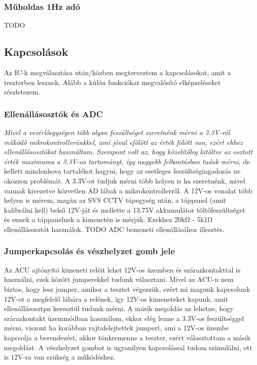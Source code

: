 \documentclass[a4paper, 12pt]{article}
\newcommand{\tab}{\hspace*{1em}}
\begin{document}
\subsubsection{Műholdas 1Hz adó}
TODO



\subsection{Kapcsolások}
Az IC-k megválasztása után/közben megterveztem a kapcsolásokat, amit a teszterben lesznek. Alább a külön funkciókat megvalósító elképzeléseket részletezem.
\subsubsection{Ellenállásosztók és ADC}
\emph{\tab Mivel a vezérlőegységen több olyan feszültséget szeretnénk mérni a 3.3V-ról működő mikrokontrollerünkkel, ami jóval efölött az érték fölött van, ezért ehhez ellenállásosztókat használtam. Szempont volt az, hogy közelítőleg kitöltve az osztott érték maximuma a 3.3V-os tartományt, így nagyobb felbontásban tudok mérni}, de kellett mindenhova tartalékot hagyni, hogy az esetleges feszültségingadozás ne okozzon problémát. A 3.3V-ot tudjuk mérni több helyen is ha szeretnénk, mivel vannak kivezetve közvetlen AD lábak a mikrokontrollerről. A 12V-os vonalat több helyen is mérem, magán az SVS CCTV tápegység után, a táppanel (amit kalibrálni kell) belső 12V-ját és mellette a 13.75V akkumulátor töltőfeszültséget és ennek a táppanelnek a kimenetén is mérjük. Ezekhez 20k\si{\ohm} - 5k1\si{\ohm} ellenállásosztót használok.
TODO ADC bemeneti ellenállásához illesztés.


\subsubsection{Jumperkapcsolás és vészhelyzet gomb jele}
\tab Az ACU ajtónyitó kimeneti reléit lehet 12V-os üzemben és szárazkontakttal is használni, ezek között jumperekkel tudunk választani. Mivel az ACU-n nem biztos, hogy lesz jumper, amikor a tesztet végezzük, ezért mi magunk kapcsolunk 12V-ot a megfelelő lábára a relének, így 12V-os kimeneteket kapunk, amit ellenállásosztpn keresztül tudunk mérni. A másik megoldás az lehetne, hogy szárazkontakt üzemmódban használom, ekkor elég lenne a 3.3V-os feszültséggel mérni, viszont ha korábban rajtafelejtettek jumpert, ami a 12V-os üzembe kapcsolja a berendezést, akkor tönkremenne a teszter, ezért választottam a másik megoldást. A vészhelyzet gombot is ugyanilyen kapcsolással tudom szimulálni, ott is 12V-ra van szükség a működéshez.
\end{document}
